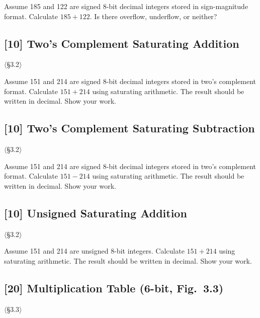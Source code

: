 \noindent Assume 185 and 122 are signed 8-bit decimal integers stored in
sign-magnitude format. Calculate $185 + 122$. Is there overflow, underflow,
or neither?

\problembreak

\subsection{[10] Two's Complement Saturating Addition}
\hypertarget{prob-3.9}{}
\noindent$\langle$\S3.2$\rangle$\medskip

\noindent Assume 151 and 214 are signed 8-bit decimal integers stored in
two's complement format. Calculate $151 + 214$ using saturating arithmetic.
The result should be written in decimal. Show your work.

\problembreak

\subsection{[10] Two's Complement Saturating Subtraction}
\hypertarget{prob-3.10}{}
\noindent$\langle$\S3.2$\rangle$\medskip

\noindent Assume 151 and 214 are signed 8-bit decimal integers stored in
two's complement format. Calculate $151 - 214$ using saturating arithmetic.
The result should be written in decimal. Show your work.

\problembreak

\subsection{[10] Unsigned Saturating Addition}
\hypertarget{prob-3.11}{}
\noindent$\langle$\S3.2$\rangle$\medskip

\noindent Assume 151 and 214 are unsigned 8-bit integers. Calculate
$151 + 214$ using saturating arithmetic. The result should be written in
decimal. Show your work.

\problembreak

\subsection{[20] Multiplication Table (6-bit, Fig.~3.3)}
\hypertarget{prob-3.12}{}
\noindent$\langle$\S3.3$\rangle$\medskip

